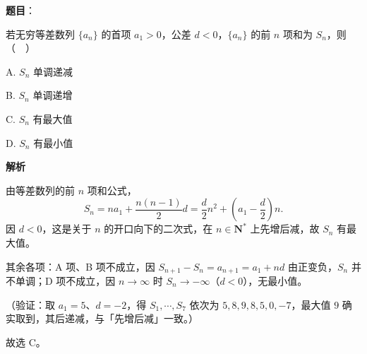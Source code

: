 \begin{answer}

\textbf{题目}：

若无穷等差数列 \(\{a_{n}\}\) 的首项 \(a_{1}>0\)，公差 \(d<0\)，\(\{a_{n}\}\) 的前 \(n\) 项和为 \(S_{n}\)，则（　）

A. \(S_{n}\) 单调递减

B. \(S_{n}\) 单调递增

C. \(S_{n}\) 有最大值

D. \(S_{n}\) 有最小值

\textbf{解析}

由等差数列的前 \(n\) 项和公式，
\nopagebreak[4]
\[
S_{n}=na_{1}+\frac{n(n-1)}{2}d=\frac{d}{2}n^{2}+\left(a_{1}-\frac{d}{2}\right)n.
\]
因 \(d<0\)，这是关于 \(n\) 的开口向下的二次式，在 \(n\in\mathbf{N}^{*}\) 上先增后减，故 \(S_{n}\) 有最大值。

其余各项：A 项、B 项不成立，因 \(S_{n+1}-S_{n}=a_{n+1}=a_{1}+nd\) 由正变负，\(S_{n}\) 并不单调；D 项不成立，因 \(n\to\infty\) 时 \(S_{n}\to-\infty\)（\(d<0\)），无最小值。

（验证：取 \(a_{1}=5\)、\(d=-2\)，得 \(S_{1},\cdots,S_{7}\) 依次为 \(5,8,9,8,5,0,-7\)，最大值 \(9\) 确实取到，其后递减，与「先增后减」一致。）

故选 C。


\end{answer}
